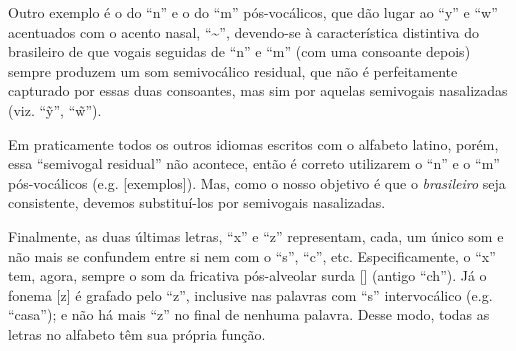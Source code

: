 \documentclass[12pt, a5paper, titlepage]{article}
\begin{document}
\begin{bilingualpages}
    Outro exemplo é o do ``n'' e o do ``m'' pós-vocálicos, que dão lugar ao ``y'' e ``w'' acentuados com o acento nasal, ``\textasciitilde'', devendo-se à característica distintiva do brasileiro de que vogais seguidas de ``n'' e ``m'' (com uma consoante depois) sempre produzem um som semivocálico residual, que não é perfeitamente capturado por essas duas consoantes, mas sim por aquelas semivogais nasalizadas (viz. ``\~y'', ``\~w'').

    Em praticamente todos os outros idiomas escritos com o alfabeto latino, porém,
    essa ``semivogal residual'' não acontece, então é correto utilizarem o ``n'' e
    o ``m'' pós-vocálicos (e.g. [exemplos]). Mas, como o nosso objetivo é que o
    \textit{brasileiro} seja consistente, devemos substituí-los por semivogais
    nasalizadas.

    Finalmente, as duas últimas letras, ``x'' e ``z'' representam, cada, um único
    som e não mais se confundem entre si nem com o ``s'', ``c'', etc.
    Especificamente, o ``x'' tem, agora, sempre o som da fricativa pós-alveolar
    surda [\textesh] (antigo ``ch''). Já o fonema [z] é grafado pelo ``z'',
    inclusive nas palavras com ``s'' intervocálico (e.g. ``casa''); e não há mais
    ``z'' no final de nenhuma palavra. Desse modo, todas as letras no alfabeto têm
    sua própria função.


\end{bilingualpages}
\end{document}
